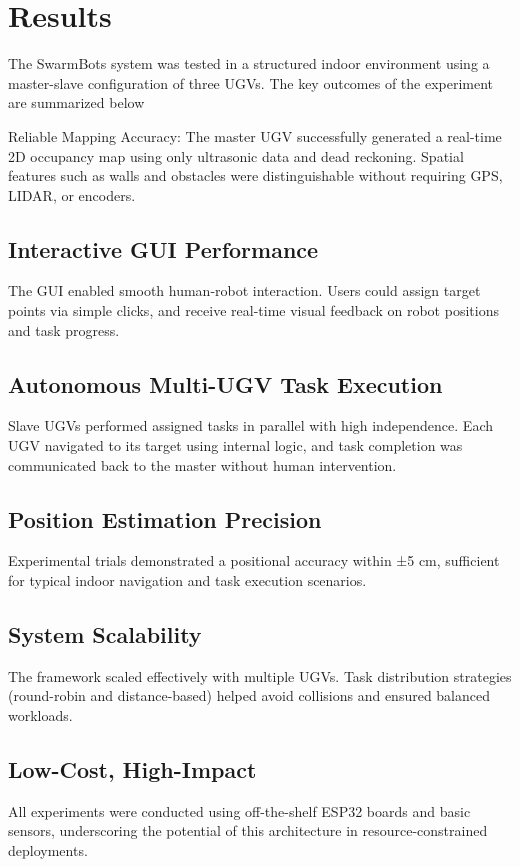 \documentclass[conference]{IEEEtran}
\begin{document}
\section{Results}
\label{sec:results}
The SwarmBots system was tested in a structured indoor environment using a master-slave configuration of three UGVs. The key outcomes of the experiment are summarized below

Reliable Mapping Accuracy: The master UGV successfully generated a real-time 2D occupancy map using only ultrasonic data and dead reckoning. Spatial features such as walls and obstacles were distinguishable without requiring GPS, LIDAR, or encoders.

\subsection{Interactive GUI Performance} 
The GUI enabled smooth human-robot interaction. Users could assign target points via simple clicks, and receive 
real-time visual feedback on robot positions and task progress.

\subsection{Autonomous Multi-UGV Task Execution}
Slave UGVs performed assigned tasks in parallel with high independence. Each UGV navigated to its target using internal logic, and task completion was communicated back to the master without human intervention.

\subsection{Position Estimation Precision}
Experimental trials demonstrated a positional accuracy within ±5 cm, sufficient for typical indoor navigation and task execution scenarios.

\subsection{System Scalability}
The framework scaled effectively with multiple UGVs. Task distribution strategies (round-robin and distance-based) helped avoid collisions and ensured balanced workloads.

\subsection{Low-Cost, High-Impact}
All experiments were conducted using off-the-shelf ESP32 boards and basic sensors, underscoring the potential of this architecture in resource-constrained deployments.
\end{document}
